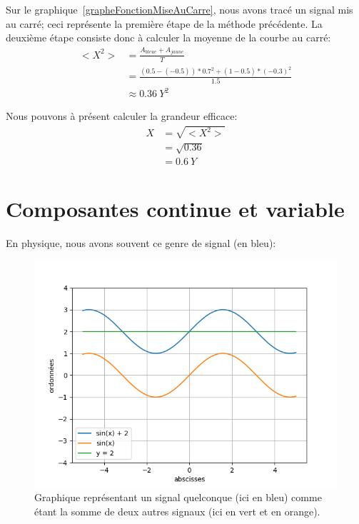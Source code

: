 \documentclass[12pt,a4paper,openany]{book}
\begin{document}
Sur le graphique~\ref{grapheFonctionMiseAuCarre}, nous avons tracé un signal mis au carré; ceci représente la première étape de la méthode précédente. La deuxième étape consiste donc à calculer la moyenne de la courbe au carré:
\begin{align*}
<X^{2}> & = \frac{A_{bleue} + A_{jaune}}{T}\\
	& = \frac{(0.5 - (-0.5))*0.7^{2} + (1 - 0.5)*(-0.3)^{2}}{1.5}\\
	& \approx 0.36~Y^{2}
\end{align*}

Nous pouvons à présent calculer la grandeur efficace:
\begin{align*}
X 	& = \sqrt{<X^{2}>}\\
	& = \sqrt{0.36}\\
	& = 0.6~Y
\end{align*}

\newpage

\section{Composantes continue et variable}

En physique, nous avons souvent ce genre de signal (en bleu):
\begin{figure}[!h]
\begin{center}
\includegraphics[scale=0.8]{Images/composanteVariableContinue.png} 
\caption{Graphique représentant un signal quelconque (ici en bleu) comme étant la somme de deux autres signaux (ici en vert et en orange).}
\label{composanteVariableContinue}
\end{center}
\end{figure}
\end{document}
